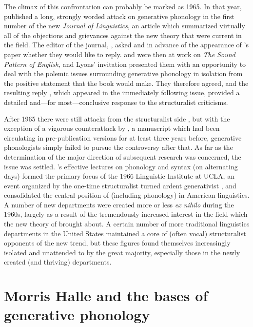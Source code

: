 The climax of this confrontation can probably be marked as 1965. In
that year,  published a long, strongly worded attack
on generative pho\-nology \citep{householder:recent_claims} in the first
number of the new \textsl{Journal of Linguistics}, an article which
summarized virtually all of the objections and grievances against the
new theory that were current in the field. The editor of the journal,
, asked {\Chomsky} and {\Halle} in advance of the appearance of
{\Householder}'s paper whether they would like to reply. {\Chomsky} and
{\Halle} were then at work on \textsl{The Sound Pattern of English}, and
Lyons' invitation presented them with an opportunity to deal with the
polemic issues surrounding generative phonology in isolation from the
positive statement that the book would make. They therefore agreed,
and the resulting reply \citep{chomsky:halle65:householder_reply},
which appeared in the immediately following issue, provided a detailed
and—for most—conclusive response to the structuralist criticisms.

After 1965 there were still attacks from the structuralist side
\citep[e.g.][]{hockett68:state.of.the.art,lamb66:stratificational.grammar},
but with the exception of a vigorous counterattack by
\citet{postal68:aspects}, a manuscript which had been circulating in
pre-publication versions for at least three years before, generative
phonologists simply failed to pursue the controversy after that. As far
as the determination of the major direction of subsequent research was
concerned, the issue was settled. {\Chomsky}'s effective lectures on
 phonology and syntax (on alternating days) formed the primary focus of
the 1966 {Linguistic Institute} at UCLA, an event organized by the
one-time structuralist turned ardent generativist ,
and consolidated the central position of  (including
phonology) in American linguistics. A number of new departments were
created more or less \emph{ex nihilo} during the 1960s, largely as a
result of the tremendously increased interest in the field which the
new theory of  brought about. A certain number of
more traditional linguistics departments in the United States
maintained a core of (often vocal) structuralist opponents of the new
trend, but these figures found themselves increasingly isolated and
unattended to by the great majority, especially those in the newly
created (and thriving) departments.

\section{Morris Halle and the bases of generative   phonology}


